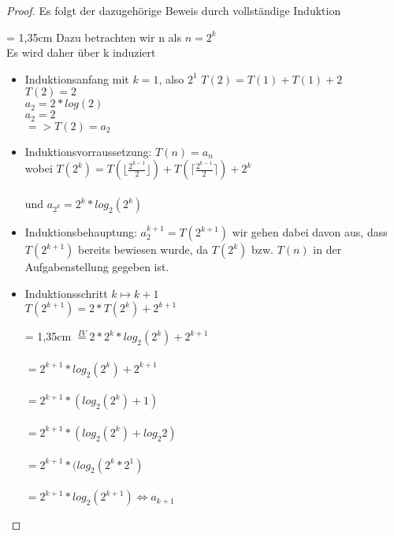 \begin{proof}
        Es folgt der dazugehörige Beweis durch vollständige Induktion 
        \par
        \begingroup
        \leftskip = 1,35cm
        \noindent
			Dazu betrachten wir n als $n=2^k$\\
			Es wird daher über k induziert
		\par
        \endgroup
        

	\begin{itemize}
	\item Induktionsanfang mit $k=1$, also $2^1$
		$T(2) = T(1) + T(1) + 2$\\
		$T(2) = 2$\\
     	$a_2 = 2 * log(2)$\\
    	$a_2 = 2$\\
     	$=> T(2) = a_2$
        
    \item Induktionsvorraussetzung: $T(n) = a_{n}$\\
    	wobei $T(2^k) = T(\lfloor{\frac{2^{k-1}}{2}}\rfloor) + T(\lceil{\frac{2^{k-1}}{2}}\rceil) + 2^k$\\
        \\
    	und $a_{2^k} = 2^k * log_{2}(2^k)$
    \item Induktionsbehauptung: $a_2^{k+1} = T(2^{k+1})$ 
    	wir gehen dabei davon aus, dass $T(2^{k+1})$ bereits bewiesen wurde, da $T(2^k)$ bzw. $T(n)$ in der Aufgabenstellung gegeben ist.   
    \item Induktionsschritt $k \mapsto k+1$ \\
       
       $T(2^{k+1}) = 2 * T(2^k) + 2^{k+1}$
       \par
       \begingroup
       \leftskip = 1,35cm 
       \noindent
       $ \overset{IV}{=} 2 * 2^k * log_{2}(2^k) + 2^{k+1}$ \\
       \\
       $ = 2^{k+1} * log_{2}(2^k) + 2^{k+1}$ \\
       \\
       $ = 2^{k+1} * (log_{2}(2^k) + 1)$ \\
       \\
       $ = 2^{k+1} * (log_{2}(2^k) + log_{2}2)$\\
       \\
       $ = 2^{k+1} * (log_{2}(2^k * 2^1)$ \\
       \\
       $ = 2^{k+1} * log_{2}(2^{k+1}) \Leftrightarrow a_{k+1}$ 
       \par
       \endgroup  
      
   	 \end{itemize}
	\end{proof}
    
